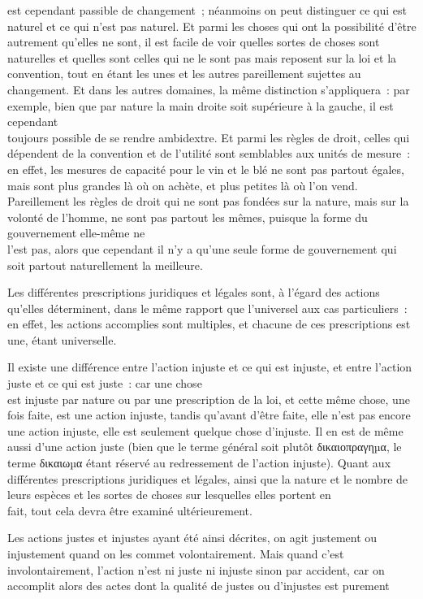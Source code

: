 \documentclass[french,twoside]{book} %
\begin{document}
est cependant passible de changement ; néanmoins on peut distinguer ce qui est naturel et ce qui n’est pas naturel. Et parmi les choses qui ont la possibilité d’être autrement qu’elles ne sont, il est facile de voir quelles sortes de choses sont naturelles et quelles sont celles qui ne le sont pas mais reposent sur la loi et la convention, tout en étant les unes et les autres pareillement sujettes au changement. Et dans les autres domaines, la même distinction s’appliquera : par exemple, bien que par nature la main droite soit supérieure à la gauche, il est cependant \\
toujours possible de se rendre ambidextre. Et parmi les règles de droit, celles qui dépendent de la convention et de l’utilité  sont semblables aux unités de mesure : en effet, les mesures de capacité pour le vin et le blé ne sont pas partout égales, mais sont plus grandes là où on achète, et plus petites là où l’on vend. Pareillement les règles de droit qui ne sont pas fondées sur la nature, mais sur la volonté de l’homme, ne sont pas partout les mêmes, puisque la forme du gouvernement elle-même ne \\
l’est pas, alors que cependant il n’y a qu’une seule forme de gouvernement qui soit partout naturellement la meilleure.\par
Les différentes prescriptions juridiques et légales sont, à l’égard des actions qu’elles déterminent, dans le même rapport que l’universel aux cas particuliers : en effet, les actions accomplies sont multiples, et chacune de ces prescriptions est une, étant universelle.\par
Il existe une différence entre l’action injuste et ce qui est injuste, et entre l’action juste et ce qui est juste : car une chose \\
est injuste par nature ou par une prescription de la loi, et cette même chose, une fois faite, est une action injuste, tandis qu’avant d’être faite, elle n’est pas encore une action injuste, elle est seulement quelque chose d’injuste. Il en est de même aussi d’une action juste (bien que le terme général soit plutôt δικαιοπραγηµα, le terme δικαιωµα étant réservé au redressement de l’action injuste). Quant aux différentes prescriptions juridiques et légales, ainsi que la nature et le nombre de leurs espèces et les sortes de choses sur lesquelles elles portent en \\
fait, tout cela devra être examiné ultérieurement.\par
Les actions justes et injustes ayant été ainsi décrites, on agit justement ou injustement quand on les commet volontairement. Mais quand c’est involontairement, l’action n’est ni juste ni injuste sinon par accident, car on accomplit alors des actes dont la qualité de justes ou d’injustes est purement \\
\end{document}
